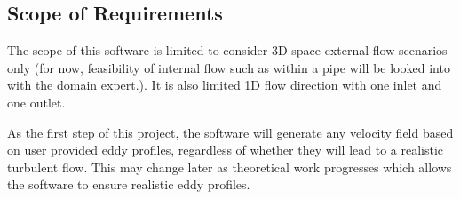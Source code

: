 \documentclass[12pt]{article}
\begin{document}

\subsection{Scope of Requirements} 

The scope of this software is limited to consider 3D space external flow scenarios only (for now, feasibility of internal flow such as within a pipe will be looked into with the domain expert.). It is also limited 1D flow direction with one inlet and one outlet.

As the first step of this project, the software will generate any velocity field based on user provided eddy profiles, regardless of whether they will lead to a realistic turbulent flow. This may change later as theoretical work progresses which allows the software to ensure realistic eddy profiles.



\end{document}
